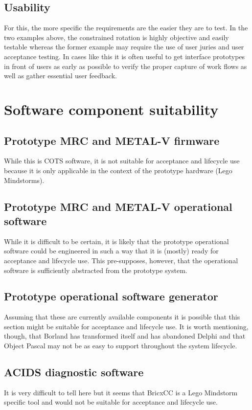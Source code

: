 \documentclass[letterpaper,10pt]{article}
\begin{document}
\subsection{Usability}
For this, the more specific the requirements are the easier they are to test.  In the two examples above, the constrained rotation is highly objective and easily testable whereas the former example may require the use of user juries  and user acceptance testing.  In cases like this it is often useful to get interface prototypes in front of users as early as possible to verify the proper capture of work flows as well as gather essential user feedback.

\section{Software component suitability}
\subsection{Prototype MRC and METAL-V firmware}
While this is COTS software, it is not suitable for acceptance and lifecycle use because it is only applicable in the context of the prototype hardware (Lego Mindstorms).
\subsection{Prototype MRC and METAL-V operational software}
While it is difficult to be certain, it is likely that the prototype operational software could be engineered in such a way that it is (mostly) ready for acceptance and lifecycle use.  This pre-supposes, however, that the operational software is sufficiently abstracted from the prototype system.
\subsection{Prototype operational software generator}
Assuming that these are currently available components it is possible that this section might be suitable for acceptance and lifecycle use.  It is worth mentioning, though, that Borland has transformed itself and has abandoned Delphi and that Object Pascal may not be as easy to support throughout the system lifecycle.
\subsection{ACIDS diagnostic software}
It is very difficult to tell here but it seems that BricxCC is a Lego Mindstorm specific tool and would not be suitable for acceptance and lifecycle use.
\end{document}
